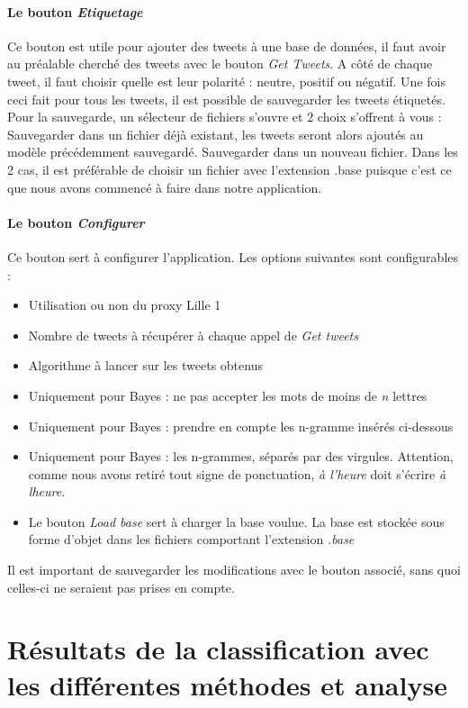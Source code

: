 \documentclass[a4paper,10pt]{report}
\begin{document}
      \subsubsection{Le bouton \textit{Etiquetage}}
	Ce bouton est utile pour ajouter des tweets à une base de données, il faut avoir au préalable cherché des tweets avec le bouton \textit{Get Tweets}.
	A côté de chaque tweet, il faut choisir quelle est leur polarité : neutre, positif ou négatif. Une fois ceci fait pour tous les tweets,
	il est possible de sauvegarder les tweets étiquetés. Pour la sauvegarde, un sélecteur de fichiers s'ouvre et 2 choix s'offrent à vous :
	Sauvegarder dans un fichier déjà existant, les tweets seront alors ajoutés au modèle précédemment sauvegardé.
	Sauvegarder dans un nouveau fichier.  
	Dans les 2 cas, il est préférable de choisir un fichier avec l'extension .base puisque c'est ce que nous avons commencé à faire dans notre application.
      \subsubsection{Le bouton \textit{Configurer}}
	
	Ce bouton sert à configurer l'application. Les options suivantes sont configurables :
	\begin{itemize}
	 \item Utilisation ou non du proxy Lille 1
	 \item Nombre de tweets à récupérer à chaque appel de \textit{Get tweets}
	 \item Algorithme à lancer sur les tweets obtenus
	 \item Uniquement pour Bayes : ne pas accepter les mots de moins de \textit{n} lettres
	 \item Uniquement pour Bayes : prendre en compte les n-gramme insérés ci-dessous
	 \item Uniquement pour Bayes : les n-grammes, séparés par des virgules. Attention, comme nous avons retiré tout signe de ponctuation, \textit{à l'heure} doit s'écrire \textit{à lheure}.
	 \item Le bouton \textit{Load base} sert à charger la base voulue. La base est stockée sous forme d'objet dans les fichiers comportant l'extension \textit{.base}
	\end{itemize}
	Il est important de sauvegarder les modifications avec le bouton associé, sans quoi celles-ci ne seraient pas prises en compte.

\chapter{Résultats de la classification avec les différentes méthodes et analyse}
\end{document}
